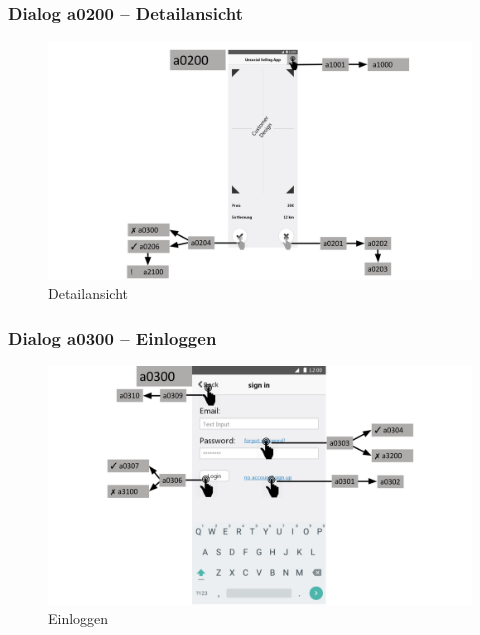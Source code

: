 \documentclass[a4paper,12pt,oneside]{scrartcl}
\begin{document}
\subsubsection{Dialog a0200 – Detailansicht}
\begin{figure}[!htbp]
\centering
\noindent\includegraphics[width=\linewidth,height=\textheight,keepaspectratio]{Dialoge/a0200}
\caption{Detailansicht}
\end{figure}
\FloatBarrier

\subsubsection{Dialog a0300 – Einloggen}
\begin{figure}[!htbp]
\centering
\noindent\includegraphics[width=\linewidth,height=\textheight,keepaspectratio]{Dialoge/a0300}
\caption{Einloggen}
\end{figure}
\FloatBarrier
\end{document}
